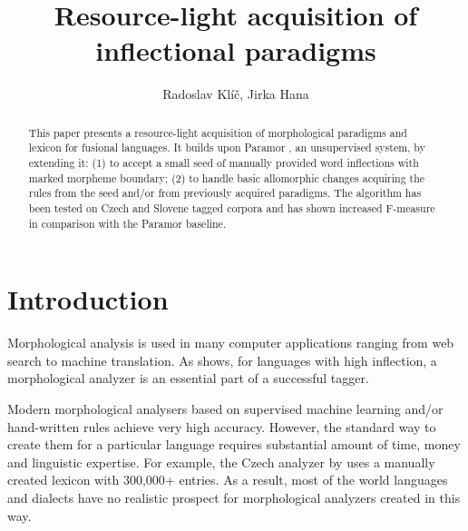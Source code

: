\documentclass{itatnew}
\newcommand{\todo}[1]{[\textbf{TODO} #1]}
\begin{document}
\title{Resource-light acquisition of inflectional paradigms}

\author{Radoslav Klíč, Jirka Hana}


\maketitle              %

\begin{abstract}
This paper presents a resource-light acquisition of morphological paradigms and lexicon for fusional languages. It builds upon Paramor \cite{monson09}, an unsupervised system, by extending it: 
%
(1) to accept a small seed of manually provided word inflections with marked morpheme boundary;
%
(2) to handle basic allomorphic changes acquiring the rules from the seed and/or from previously acquired paradigms.
The algorithm has been tested on Czech and Slovene tagged corpora and has shown increased F-measure in comparison with the Paramor baseline.
\end{abstract}
\section{Introduction}

Morphological analysis is used in many computer applications ranging from web search to machine translation. As \cite{hajic-2000-naacl} shows, for languages with high inflection, a morphological analyzer is an essential part of a successful tagger.

Modern morphological analysers based on supervised machine learning and/or hand-written rules achieve very high accuracy. However, the standard way to create them for a particular language requires substantial amount of time, money and linguistic expertise. For example, the Czech analyzer by \cite{hajic-2004-hab} uses a manually created lexicon with 300,000+ entries. As a result, most of the world languages and dialects have no realistic prospect for morphological analyzers created in this way.
\end{document}
